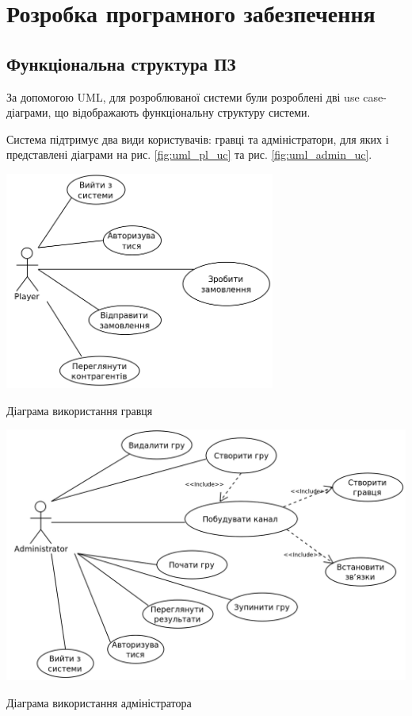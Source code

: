 \section{Розробка програмного забезпечення}
\subsection{Функціональна структура ПЗ}
За допомогою UML, для розроблюваної системи були розроблені дві use case-діаграми, що відображають функціональну структуру системи.

Система підтримує два види користувачів: гравці та адміністратори, для яких і представлені діаграми на рис. \ref{fig:uml_pl_uc} та рис. \ref{fig:uml_admin_uc}.
\begin{stdfigure}
    \includegraphics[width=3.5in]{images/uml/player_use_cases.png}
    \caption{Діаграма використання гравця}
    \label{fig:uml_pl_uc}
\end{stdfigure}   

\begin{stdfigure}
    \includegraphics[width=6in]{images/uml/admin_use_cases.png}
    \caption{Діаграма використання адміністратора}
    \label{fig:uml_admin_uc}
\end{stdfigure}
